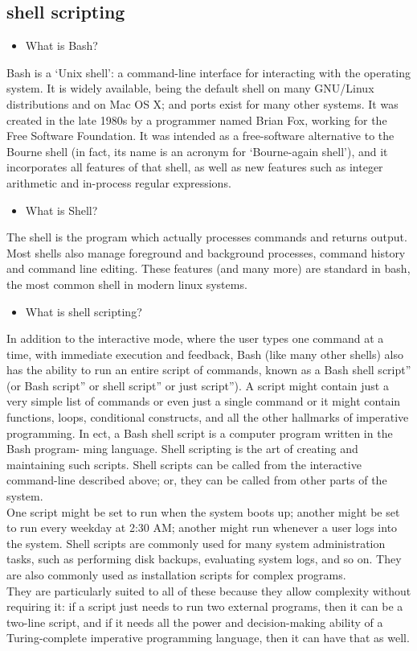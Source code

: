 \subsection{shell scripting}
\begin{itemize}
\item What is Bash?
\end{itemize}
Bash is a ‘Unix shell’: a command-line interface for interacting with the operating system. It is
widely available, being the default shell on many GNU/Linux distributions and on Mac OS X; and
ports exist for many other systems. It was created in the late 1980s by a programmer named Brian
Fox, working for the Free Software Foundation. It was intended as a free-software alternative to
the Bourne shell (in fact, its name is an acronym for ‘Bourne-again shell’), and it incorporates
all features of that shell, as well as new features such as integer arithmetic and in-process regular
expressions.
\begin{itemize}
\item What is Shell?
\end{itemize}
The shell is the program which actually processes commands and returns output. Most shells also
manage foreground and background processes, command history and command line editing. These
features (and many more) are standard in bash, the most common shell in modern linux systems.
\begin{itemize}
\item What is shell scripting?
\end{itemize}
In addition to the interactive mode, where the user types one command at a time, with immediate
execution and feedback, Bash (like many other shells) also has the ability to run an entire script of
commands, known as a Bash shell script” (or Bash script” or shell script” or just script”). A script
might contain just a very simple list of commands or even just a single command or it might contain
functions, loops, conditional constructs, and all the other hallmarks of imperative programming. In
ect, a Bash shell script is a computer program written in the Bash program- ming language. Shell scripting is the art of creating and maintaining such scripts. Shell scripts can be called from the
interactive command-line described above; or, they can be called from other parts of the system.\\
One script might be set to run when the system boots up; another might be set to run every weekday
at 2:30 AM; another might run whenever a user logs into the system. Shell scripts are commonly
used for many system administration tasks, such as performing disk backups, evaluating system
logs, and so on. They are also commonly used as installation scripts for complex programs.\\ They
are particularly suited to all of these because they allow complexity without requiring it: if a script
just needs to run two external programs, then it can be a two-line script, and if it needs all the power
and decision-making ability of a Turing-complete imperative programming language, then it can
have that as well.\\
